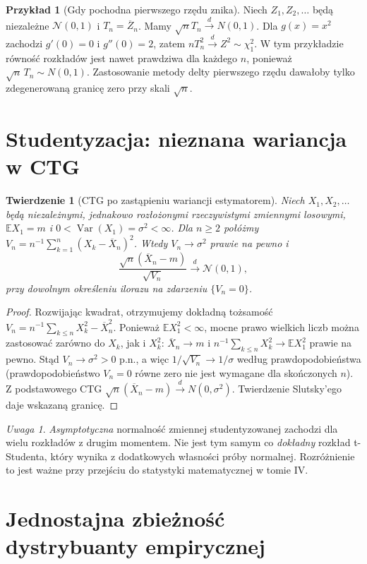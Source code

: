 \documentclass[11pt,a4paper,oneside]{report}
\numberwithin{equation}{chapter}
\theoremstyle{plain}
\newtheorem{twierdzenie}{Twierdzenie}[chapter]
\theoremstyle{definition}
\newtheorem{przyklad}{Przykład}[chapter]
\theoremstyle{remark}
\newtheorem{uwaga}{Uwaga}[chapter]
\newcommand{\E}{\mathbb{E}}
\newcommand{\Var}{\operatorname{Var}}
\newcommand{\Normal}{\mathcal{N}}
\begin{document}
\begin{przyklad}[Gdy pochodna pierwszego rzędu znika]
Niech $Z_1,Z_2,\ldots$ będą niezależne
$\Normal(0,1)$ i $T_n=\overline Z_n$.
Mamy $\sqrt n T_n\xrightarrow d N(0,1)$.
Dla $g(x)=x^2$ zachodzi $g'(0)=0$
i $g''(0)=2$, zatem
$nT_n^2\xrightarrow d Z^2\sim\chi^2_1$.
W tym przykładzie równość rozkładów jest nawet
prawdziwa dla każdego $n$, ponieważ
$\sqrt n\,T_n\sim N(0,1)$. Zastosowanie
metody delty pierwszego rzędu dawałoby tylko
zdegenerowaną granicę zero przy skali $\sqrt n$.
\end{przyklad}

\section{Studentyzacja: nieznana wariancja w CTG}

\begin{twierdzenie}[CTG po zastąpieniu wariancji estymatorem]
Niech $X_1,X_2,\ldots$ będą niezależnymi,
jednakowo rozłożonymi rzeczywistymi zmiennymi losowymi,
$\E X_1=m$ i $0<\Var(X_1)=\sigma^2<\infty$.
Dla $n\geq2$ połóżmy
$V_n=n^{-1}\sum_{k=1}^n(X_k-\overline X_n)^2$.
Wtedy $V_n\to\sigma^2$ prawie na pewno i
\[
\frac{\sqrt n(\overline X_n-m)}{\sqrt{V_n}}
\xrightarrow d\Normal(0,1),
\]
przy dowolnym określeniu ilorazu na zdarzeniu
$\{V_n=0\}$.
\end{twierdzenie}
\begin{proof}
Rozwijając kwadrat, otrzymujemy dokładną tożsamość
$V_n=n^{-1}\sum_{k\leq n}X_k^2-\overline X_n^2$.
Ponieważ $\E X_1^2<\infty$, mocne prawo wielkich
liczb można zastosować zarówno do $X_k$, jak i $X_k^2$:
$\overline X_n\to m$ i
$n^{-1}\sum_{k\leq n}X_k^2\to\E X_1^2$
prawie na pewno. Stąd $V_n\to\sigma^2>0$ p.n.,
a więc $1/\sqrt{V_n}\to1/\sigma$ według
prawdopodobieństwa (prawdopodobieństwo $V_n=0$
równe zero nie jest wymagane dla skończonych $n$).
Z podstawowego CTG
$\sqrt n(\overline X_n-m)\xrightarrow d N(0,\sigma^2)$.
Twierdzenie Slutsky'ego daje wskazaną granicę.
\end{proof}

\begin{uwaga}
\emph{Asymptotyczna} normalność zmiennej
studentyzowanej zachodzi dla wielu rozkładów
z drugim momentem. Nie jest tym samym co
\emph{dokładny} rozkład t-Studenta, który
wynika z dodatkowych własności próby normalnej.
Rozróżnienie to jest ważne przy przejściu
do statystyki matematycznej w tomie IV.
\end{uwaga}

\section{Jednostajna zbieżność dystrybuanty empirycznej}
\end{document}
